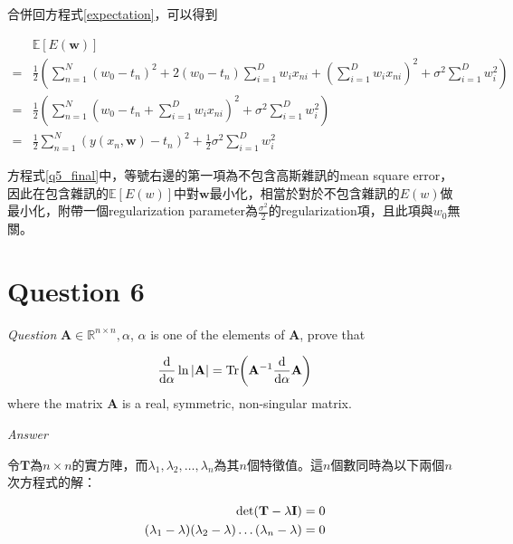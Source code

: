 \documentclass{article}
\begin{document}
合併回方程式\ref{expectation}，可以得到

\begin{equation}\label{q5_final}
\begin{aligned}
 &\mathbb E[E(\mathbf w)]\\
=& \frac{1}{2}\left(\sum\limits_{n=1}^N (w_0-t_n)^2+2(w_0-t_n)\sum\limits_{i=1}^D w_i x_{ni}+\left(\sum\limits_{i=1}^D w_i x_{ni}\right)^2 + \sigma^2\sum\limits_{i=1}^D w_i^2\right)\\
=& \frac{1}{2}\left(\sum\limits_{n=1}^N \left(w_0-t_n+\sum\limits_{i=1}^D w_i x_{ni}\right)^2 + \sigma^2\sum\limits_{i=1}^D w_i^2\right)\\
=& \frac{1}{2}\sum\limits_{n=1}^N (y(x_n, \mathbf w)-t_n)^2 + \frac{1}{2}\sigma^2\sum\limits_{i=1}^D w_i^2
\end{aligned}
\end{equation}

方程式\ref{q5_final}中，等號右邊的第一項為不包含高斯雜訊的mean square error，因此在包含雜訊的$\mathbb E[E(w)]$中對$\mathbf w$最小化，相當於對於不包含雜訊的$E(w)$做最小化，附帶一個regularization parameter為$\frac{\sigma^2}{2}$的regularization項，且此項與$w_0$無關。

\section{Question 6}

\emph{Question} $\mathbf A \in \mathbb R^{n \times n}, \alpha$, $\alpha$ is one of the elements of $\mathbf A$, prove that

\begin{equation*}
\frac{\mathrm d}{\mathrm d \alpha }\ln|\mathbf A|= \rm Tr\bigg(\mathbf A^{-1}\frac{\mathrm d}{\mathrm d \alpha}\mathbf A \bigg)
\end{equation*}
where the matrix $\mathbf A$ is a real, symmetric, non-singular matrix.

\emph{Answer}

令$\mathbf T$為$n \times n$的實方陣，而$\lambda_1, \lambda_2, \ldots, \lambda_n$為其$n$個特徵值。這$n$個數同時為以下兩個$n$次方程式的解：

\begin{equation}
\begin{aligned}
\rm det(\mathbf T-\lambda\mathbf I)=0\\
(\lambda_1 - \lambda)(\lambda_2 - \lambda)\ldots(\lambda_n - \lambda)=0
\end{aligned}
\end{equation}
\end{document}

